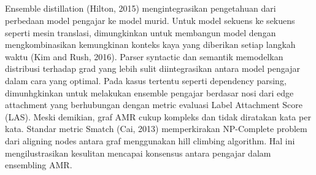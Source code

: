 \subsection{ }

Ensemble distillation (Hilton, 2015) mengintegrasikan pengetahuan dari perbedaan model pengajar ke model murid.
Untuk model sekuens ke sekuens seperti mesin translasi, dimungkinkan untuk membangun model dengan mengkombinasikan kemungkinan konteks kaya yang diberikan setiap langkah waktu (Kim and Rush, 2016).
Parser syntactic dan semantik memodelkan distribusi terhadap grad yang lebih sulit diintegrasikan antara model pengajar dalam cara yang optimal.
Pada kasus tertentu seperti dependency parsing, dimunhgkinkan untuk melakukan ensemble pengajar berdasar nosi dari edge attachment yang berhubungan dengan metric evaluasi Label Attachment Score (LAS).
Meski demikian, graf AMR cukup kompleks dan tidak diratakan kata per kata.
Standar metric Smatch (Cai, 2013) memperkirakan NP-Complete problem dari aligning nodes antara graf menggunakan hill climbing algorithm.
Hal ini mengilustrasikan kesulitan mencapai konsensus antara pengajar dalam ensembling AMR.

